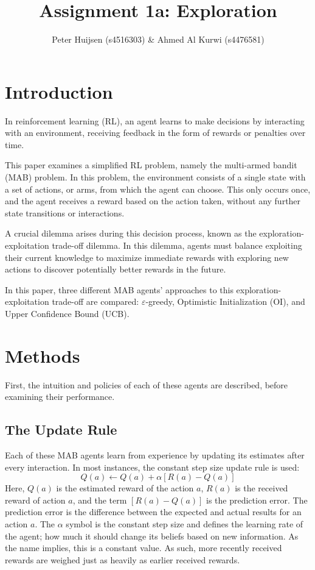 \documentclass[sigconf,nonacm]{acmart}
\title[RL Bachelor]{
    Assignment 1a: Exploration
}
\author{Peter Huijsen (s4516303) \& Ahmed Al Kurwi (s4476581)}
\affiliation{
    Group Number: 43
    \country{} \institution{} \city{} %
}
\begin{document}
\pagestyle{fancy} 
\lhead{}
\maketitle


\section{Introduction}
In reinforcement learning (RL), an agent learns to make decisions by interacting with an environment, receiving feedback in the form of rewards or penalties over time.

This paper examines a simplified RL problem, namely the multi-armed bandit (MAB) problem.
In this problem, the environment consists of a single state with a set of actions, or arms, from which the agent can choose.
This only occurs once, and the agent receives a reward based on the action taken, without any further state transitions or interactions.

A crucial dilemma arises during this decision process, known as the exploration-exploitation trade-off dilemma. 
In this dilemma, agents must balance exploiting their current knowledge to maximize immediate rewards with exploring new actions to discover potentially better rewards in the future.

In this paper, three different MAB agents' approaches to this exploration-exploitation trade-off are compared: $\varepsilon$-greedy, Optimistic Initialization (OI), and Upper Confidence Bound (UCB).

\section{Methods}
First, the intuition and policies of each of these agents are described, before examining their performance.

\subsection{The Update Rule}
Each of these MAB agents learn from experience by updating its estimates after every interaction.
In most instances, the constant step size update rule is used:
\begin{equation}
    Q(a)\leftarrow Q(a) + \alpha [R(a) - Q(a)]
\end{equation}
Here, $Q(a)$ is the estimated reward of the action $a$, $R(a)$ is the received reward of action $a$, and the term $[R(a) - Q(a)]$ is the prediction error. 
The prediction error is the difference between the expected and actual results for an action $a$. 
The $\alpha$ symbol is the constant step size and defines the learning rate of the agent; how much it should change its beliefs based on new information. As the name implies, this is a constant value. As such, more recently received rewards are weighed just as heavily as earlier received rewards.
\end{document}
